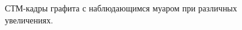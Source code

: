 \documentclass[a4paper, 12pt]{article}
\begin{document}
\begin{figure}[H]
	\centering
	\caption{СТМ-кадры графита с наблюдающимся муаром при различных увеличениях.}
	\label{fig:2_muar}
\end{figure}
\end{document}
